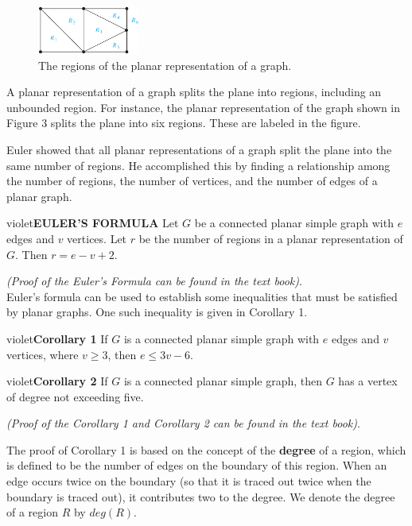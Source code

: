 \documentclass[11pt]{article}
\begin{document}
\begin{figure}
    \centering
    \includegraphics[width=0.3\textwidth]{img/ch10.7-figure8.png}
    \caption{The regions of the planar representation of a graph.}
\end{figure}

A planar representation of a graph splits the plane into regions, including an unbounded region. For instance, the planar representation of the graph shown in Figure 3 splits the plane into six regions. These are labeled in the figure. 

Euler showed that all planar representations of a graph split the plane into the same number of regions. He accomplished this by finding a relationship among the number of regions, the number of vertices, and the number of edges of a planar graph.

\begin{mybox}{violet}{\textbf{EULER’S FORMULA}}
Let $G$ be a connected planar simple graph with $e$ edges and $v$ vertices. Let $r$ be the number of regions in a planar representation of $G$. Then $r = e - v + 2$.
\end{mybox}

\textit{(Proof of the Euler's Formula can be found in the text book)}.\\

Euler’s formula can be used to establish some inequalities that must be satisfied by planar graphs. One such inequality is given in Corollary 1.

\begin{mybox}{violet}{\textbf{Corollary 1}}
If $G$ is a connected planar simple graph with $e$ edges and $v$ vertices, where $v \geq 3$, then $e \leq 3v - 6$.
\end{mybox}

\begin{mybox}{violet}{\textbf{Corollary 2}}
If $G$ is a connected planar simple graph, then $G$ has a vertex of degree not exceeding five.
\end{mybox}

\textit{(Proof of the Corollary 1 and Corollary 2 can be found in the text book)}.

The proof of Corollary 1 is based on the concept of the \textbf{degree} of a region, which is defined to be the number of edges on the boundary of this region. When an edge occurs twice on the boundary (so that it is traced out twice when the boundary is traced out), it contributes two to the degree. We denote the degree of a region $R$ by $deg(R)$.
\end{document}
